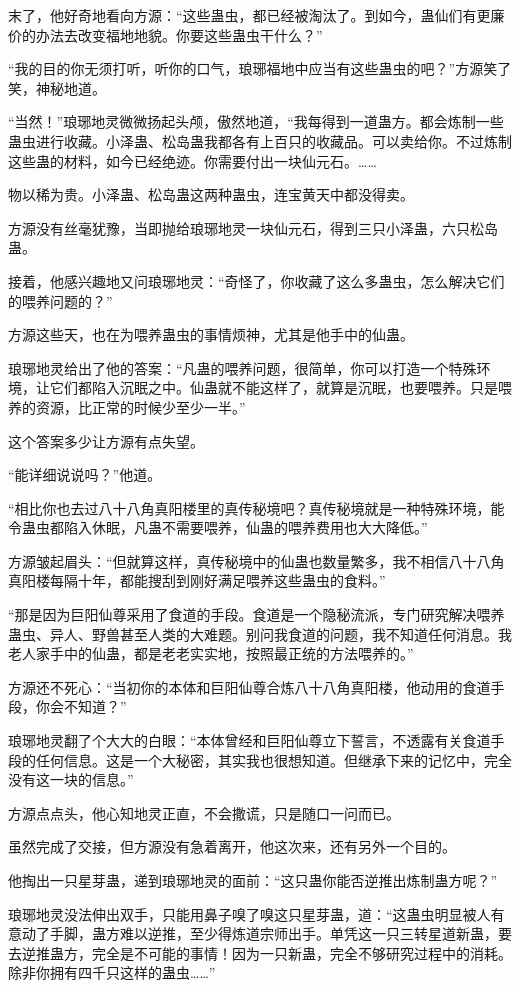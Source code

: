 \begin{this_body}
末了，他好奇地看向方源：“这些蛊虫，都已经被淘汰了。到如今，蛊仙们有更廉价的办法去改变福地地貌。你要这些蛊虫干什么？”

“我的目的你无须打听，听你的口气，琅琊福地中应当有这些蛊虫的吧？”方源笑了笑，神秘地道。

“当然！”琅琊地灵微微扬起头颅，傲然地道，“我每得到一道蛊方。都会炼制一些蛊虫进行收藏。小泽蛊、松岛蛊我都各有上百只的收藏品。可以卖给你。不过炼制这些蛊的材料，如今已经绝迹。你需要付出一块仙元石。……

物以稀为贵。小泽蛊、松岛蛊这两种蛊虫，连宝黄天中都没得卖。

方源没有丝毫犹豫，当即抛给琅琊地灵一块仙元石，得到三只小泽蛊，六只松岛蛊。

接着，他感兴趣地又问琅琊地灵：“奇怪了，你收藏了这么多蛊虫，怎么解决它们的喂养问题的？”

方源这些天，也在为喂养蛊虫的事情烦神，尤其是他手中的仙蛊。

琅琊地灵给出了他的答案：“凡蛊的喂养问题，很简单，你可以打造一个特殊环境，让它们都陷入沉眠之中。仙蛊就不能这样了，就算是沉眠，也要喂养。只是喂养的资源，比正常的时候少至少一半。”

这个答案多少让方源有点失望。

“能详细说说吗？”他道。

“相比你也去过八十八角真阳楼里的真传秘境吧？真传秘境就是一种特殊环境，能令蛊虫都陷入休眠，凡蛊不需要喂养，仙蛊的喂养费用也大大降低。”

方源皱起眉头：“但就算这样，真传秘境中的仙蛊也数量繁多，我不相信八十八角真阳楼每隔十年，都能搜刮到刚好满足喂养这些蛊虫的食料。”

“那是因为巨阳仙尊采用了食道的手段。食道是一个隐秘流派，专门研究解决喂养蛊虫、异人、野兽甚至人类的大难题。别问我食道的问题，我不知道任何消息。我老人家手中的仙蛊，都是老老实实地，按照最正统的方法喂养的。”

方源还不死心：“当初你的本体和巨阳仙尊合炼八十八角真阳楼，他动用的食道手段，你会不知道？”

琅琊地灵翻了个大大的白眼：“本体曾经和巨阳仙尊立下誓言，不透露有关食道手段的任何信息。这是一个大秘密，其实我也很想知道。但继承下来的记忆中，完全没有这一块的信息。”

方源点点头，他心知地灵正直，不会撒谎，只是随口一问而已。

虽然完成了交接，但方源没有急着离开，他这次来，还有另外一个目的。

他掏出一只星芽蛊，递到琅琊地灵的面前：“这只蛊你能否逆推出炼制蛊方呢？”

琅琊地灵没法伸出双手，只能用鼻子嗅了嗅这只星芽蛊，道：“这蛊虫明显被人有意动了手脚，蛊方难以逆推，至少得炼道宗师出手。单凭这一只三转星道新蛊，要去逆推蛊方，完全是不可能的事情！因为一只新蛊，完全不够研究过程中的消耗。除非你拥有四千只这样的蛊虫……”


\end{this_body}
